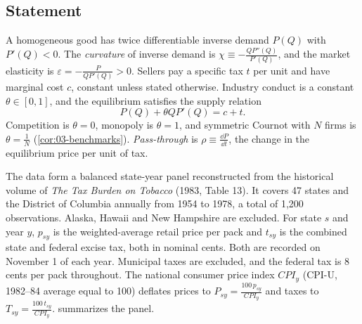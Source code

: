 \subsection{Statement}\label{sec:C-passthrough-statement}

A homogeneous good has twice differentiable inverse demand $P(Q)$ with $P'(Q) < 0$. The \emph{curvature} of inverse
demand is $\chi \equiv -\frac{QP''(Q)}{P'(Q)}$, and the market elasticity is $\varepsilon = -\frac{P}{QP'(Q)} > 0$.
Sellers pay a specific tax $t$ per unit and have marginal cost $c$, constant unless stated otherwise. Industry
conduct is a constant $\theta \in [0, 1]$, and the equilibrium satisfies the supply relation
\begin{equation}\label{eq:C-supply-tax}
P(Q) + \theta QP'(Q) = c + t .
\end{equation}
Competition is $\theta = 0$, monopoly is $\theta = 1$, and symmetric Cournot with $N$ firms is $\theta = \frac{1}{N}$
(\cref{cor:03-benchmarks}). \emph{Pass-through} is $\rho \equiv \frac{\dd P}{\dd t}$, the change in the equilibrium
price per unit of tax.

The data form a balanced state-year panel reconstructed from the historical volume of \emph{The Tax Burden on
Tobacco} (1983, Table 13). It covers 47 states and the District of Columbia annually from 1954 to 1978, a
total of 1,200 observations. Alaska, Hawaii and New Hampshire are excluded. For state $s$ and year $y$, $p_{sy}$ is
the weighted-average retail price per pack and $t_{sy}$ is the combined state and federal excise tax, both in nominal
cents. Both are recorded on November 1 of each year. Municipal taxes are excluded, and the federal tax is 8 cents per
pack throughout. The national consumer price index $CPI_y$ (CPI-U, 1982--84 average equal to 100) deflates prices to
$P_{sy} = \frac{100\,p_{sy}}{CPI_y}$ and taxes to $T_{sy} = \frac{100\,t_{sy}}{CPI_y}$. 
summarizes the panel.

